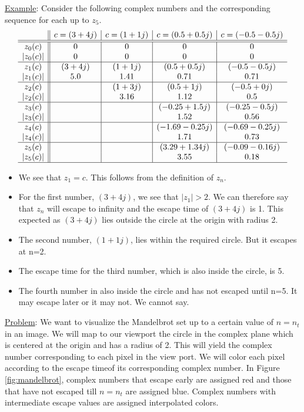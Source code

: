 \documentclass[addpoints]{exam}
\begin{document}
\begin{questions}
  \underline{Example}: Consider the following complex numbers and the corresponding sequence for each up to $z_5$.
  \[
    \begin{array}{c|*{4}{|c}}
      & c=(3+4j) & c=(1+1j) & c=(0.5+0.5j) & c=(-0.5-0.5j)\\\hline\hline
      z_0(c) & 0 & 0 & 0 & 0\\
      |z_0(c)| & 0 & 0 & 0 & 0\\\hline
      z_1(c) & (3+4j) & (1+1j) & (0.5+0.5j) & (-0.5-0.5j)\\
      |z_1(c)| & 5.0 & 1.41 & 0.71 & 0.71\\\hline
      z_2(c) &  & (1+3j) & (0.5+1j) & (-0.5+0j)\\
      |z_2(c)| &  & 3.16 & 1.12 & 0.5\\\hline
      z_3(c) &  &  & (-0.25+1.5j) & (-0.25-0.5j)\\
      |z_3(c)| &  &  & 1.52 & 0.56\\\hline
      z_4(c) &  &  & (-1.69-0.25j) & (-0.69-0.25j)\\
      |z_4(c)| &  &  & 1.71 & 0.73\\\hline
      z_5(c) &  &  & (3.29+1.34j) & (-0.09-0.16j)\\
      |z_5(c)| &  &  & 3.55 & 0.18\\\hline
    \end{array}
  \]

  \begin{itemize}
  \item We see that $z_1=c$. This follows from the definition of $z_n$.
  \item For the first number, $(3+4j)$, we see that $|z_1|>2$. We can therefore say that $z_n$ will escape to infinity and the escape time of $(3+4j)$ is 1. This expected as $(3+4j)$ lies outside the circle at the origin with radius 2.
  \item The second number, $(1+1j)$, lies within the required circle. But it escapes at n=2.
  \item The escape time for the third number, which is also inside the circle, is 5.
  \item The fourth number in also inside the circle and has not escaped until n=5. It may escape later or it may not. We cannot say.
  \end{itemize}
  
  \underline{Problem}: We want to visualize the Mandelbrot set up to a certain value of $n=n_t$ in an image. We will map to our viewport the circle in the complex plane which is centered at the origin and has a radius of 2. This will yield the complex number corresponding to each pixel in the view port. We will color each pixel according to the escape timeof its corresponding complex number. In Figure \ref{fig:mandelbrot}, complex numbers that escape early are assigned red and those that have not escaped till $n=n_t$ are assigned blue. Complex numbers with intermediate escape values are assigned interpolated colors. 


\end{questions}
\end{document}
